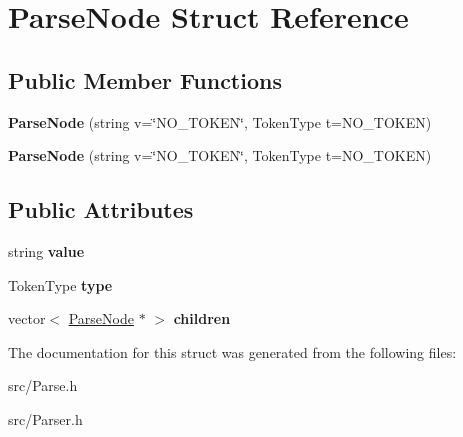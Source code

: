\hypertarget{struct_parse_node}{\section{Parse\-Node Struct Reference}
\label{struct_parse_node}
}
\subsection*{Public Member Functions}
\begin{DoxyCompactItemize}
\item 
\hypertarget{struct_parse_node_a8a7c0e1d7bf7a1a6daffbcfc4151d368}{{\bfseries Parse\-Node} (string v=\char`\"{}N\-O\-\_\-\-T\-O\-K\-E\-N\char`\"{}, Token\-Type t=N\-O\-\_\-\-T\-O\-K\-E\-N)}\label{struct_parse_node_a8a7c0e1d7bf7a1a6daffbcfc4151d368}

\item 
\hypertarget{struct_parse_node_a8a7c0e1d7bf7a1a6daffbcfc4151d368}{{\bfseries Parse\-Node} (string v=\char`\"{}N\-O\-\_\-\-T\-O\-K\-E\-N\char`\"{}, Token\-Type t=N\-O\-\_\-\-T\-O\-K\-E\-N)}\label{struct_parse_node_a8a7c0e1d7bf7a1a6daffbcfc4151d368}

\end{DoxyCompactItemize}
\subsection*{Public Attributes}
\begin{DoxyCompactItemize}
\item 
\hypertarget{struct_parse_node_a1c333d5fc4a3f3e1f53b7653c395b9cc}{string {\bfseries value}}\label{struct_parse_node_a1c333d5fc4a3f3e1f53b7653c395b9cc}

\item 
\hypertarget{struct_parse_node_a54f2ac35db892ea7ec8168ae04671381}{Token\-Type {\bfseries type}}\label{struct_parse_node_a54f2ac35db892ea7ec8168ae04671381}

\item 
\hypertarget{struct_parse_node_a8b35b78439904bd63ca4c9d6c9666ac5}{vector$<$ \hyperlink{struct_parse_node}{Parse\-Node} $\ast$ $>$ {\bfseries children}}\label{struct_parse_node_a8b35b78439904bd63ca4c9d6c9666ac5}

\end{DoxyCompactItemize}


The documentation for this struct was generated from the following files\-:\begin{DoxyCompactItemize}
\item 
src/Parse.\-h\item 
src/Parser.\-h\end{DoxyCompactItemize}
